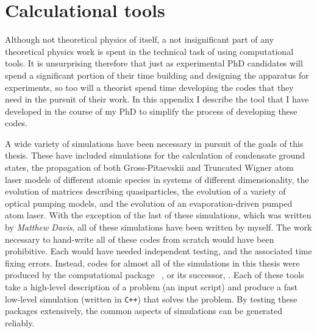 \chapter{Calculational tools}
\label{ToolsAppendix}
\graphicspath{{Figures/ToolsAppendix/}{Figures/Common/}}

Although not theoretical physics of itself, a not insignificant part of any theoretical physics work is spent in the technical task of using computational tools.  It is unsurprising therefore that just as experimental PhD candidates will spend a significant portion of their time building and designing the apparatus for experiments, so too will a theorist spend time developing the codes that they need in the pursuit of their work.  In this appendix I describe the tool that I have developed in the course of my PhD to simplify the process of developing these codes.  %

\parasep

A wide variety of simulations have been necessary in pursuit of the goals of this thesis.  These have included simulations for the calculation of condensate ground states, the propagation of both Gross-Pitaevskii and Truncated Wigner atom laser models of different atomic species in systems of different dimensionality, the evolution of matrices describing quasiparticles, the evolution of a variety of optical pumping models, and the evolution of an evaporation-driven pumped atom laser.  With the exception of the last of these simulations, which was written by \emph{Matthew Davis}, all of these simulations have been written by myself.  The work necessary to hand-write all of these codes from scratch would have been prohibitive.  Each would have needed independent testing, and the associated time fixing errors.  Instead, codes for almost all of the simulations in this thesis were produced by the computational package \XMDS\ \citep{Collecutt:2001}, or its successor, \xpdeint.  Each of these tools take a high-level description of a problem (an input script) and produce a fast low-level simulation (written in \texttt{C++}) that solves the problem.  By testing these packages extensively, the common aspects of simulations can be generated reliably.


